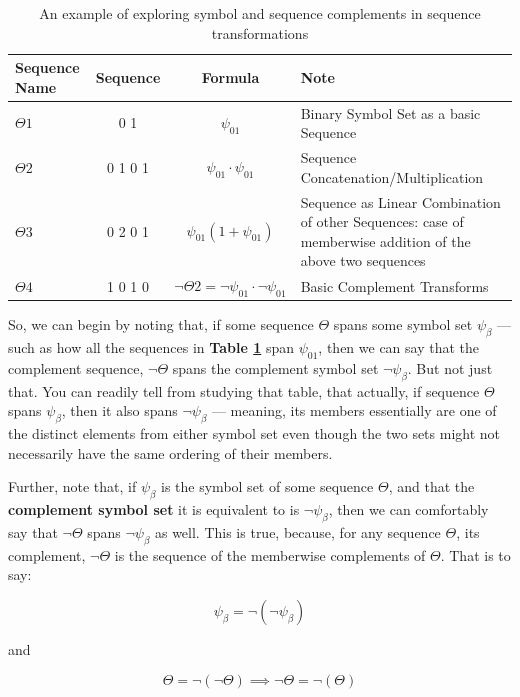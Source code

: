 \documentclass[a4paper, 18pt]{book} %
\begin{document}
\begin{table}[H]
  \centering
  \Large
	\begin{tabular}[t]{|p{2cm}|c|c|p{4cm}|}
	\hline
	Sequence Name & Sequence & Formula & Note\\
	\hline
	\hline
	$\Theta1$ & 0 1 & $\psi_{01}$ & Binary Symbol Set as a basic Sequence\\
	\hline
	$\Theta2$ & 0 1 0 1 & $\psi_{01}\cdot\psi_{01}$ & Sequence Concatenation/Multiplication\\
	\hline
	$\Theta3$ & 0 2 0 1 & $\psi_{01}(1 + \psi_{01})$ & Sequence as Linear Combination of other Sequences: case of memberwise addition of the above two sequences\\
	\hline
	$\Theta4$ & 1 0 1 0 & $\lnot\Theta2 = \lnot\psi_{01} \cdot \lnot\psi_{01}$ & Basic Complement Transforms\\
	\hline
	              
\end{tabular}
 \caption{An example of exploring symbol and sequence complements in sequence transformations}
  \label{TABCOMPLEMENTS}
\end{table}

So, we can begin by noting that, if some sequence $\Theta$ spans some symbol set $\psi_\beta$ --- such as how all the sequences in \textbf{Table \ref{TABCOMPLEMENTS}} span $\psi_{01}$, then we can say that the complement sequence, $\lnot\Theta$ spans the complement symbol set $\lnot\psi_\beta$. But not just that. You can readily tell from studying that table, that actually, if sequence $\Theta$ spans $\psi_\beta$, then it also spans $\lnot\psi_\beta$ --- meaning, its members essentially are one of the distinct elements from either symbol set even though the two sets might not necessarily have the same ordering of their members.

Further, note that, if $\psi_\beta$ is the symbol set of some sequence $\Theta$, and that the \textbf{complement symbol set} it is equivalent to is $\lnot\psi_\beta$, then we can comfortably say that $\lnot\Theta$ spans $\lnot\psi_\beta$ as well. This is true, because, for any sequence $\Theta$, its complement, $\lnot\Theta$ is the sequence of the memberwise complements of $\Theta$. That is to say:

\begin{equation}
\psi_\beta = \lnot (\lnot \psi_\beta)
\end{equation}

and 

\begin{equation}
\Theta = \lnot(\lnot\Theta) \implies \lnot\Theta = \lnot(\Theta)
\end{equation}
\end{document}
